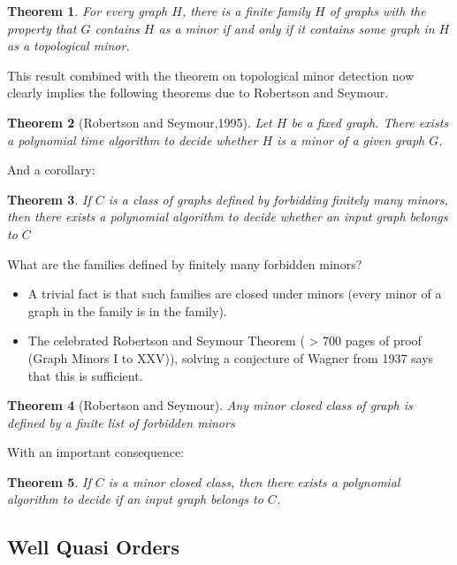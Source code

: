 \documentclass[12pt,a4paper]{article}
\newtheorem{theorem}{Theorem}
\begin{document}
\begin{theorem}
  For every graph $H$, there is a finite family $H$ of graphs with the property
  that $G$ contains $H$ as a minor if and only if it contains some graph in $H$
  as a topological minor.
\end{theorem}

This result combined with the theorem on topological minor detection now clearly
implies the following theorems due to Robertson and Seymour.

\begin{theorem}[Robertson and Seymour,1995]
  Let $H$ be a fixed graph. There exists a polynomial time algorithm to decide
  whether $H$ is a minor of a given graph $G$.
\end{theorem}

And a corollary:

\begin{theorem}
  If $C$ is a class of graphs defined by forbidding finitely many minors, then
  there exists a polynomial algorithm to decide whether an input graph belongs
  to $C$
\end{theorem}

What are the families defined by finitely many forbidden minors?
\begin{itemize}
\item A trivial fact is that such families are closed under minors (every minor
  of a graph in the family is in the family).
\item The celebrated Robertson and Seymour Theorem ( > 700 pages of proof (Graph
  Minors I to XXV)), solving a conjecture of Wagner from 1937 says that this is
  sufficient.
\end{itemize}

\begin{theorem}[Robertson and Seymour]
  Any minor closed class of graph is defined by a finite list of forbidden
  minors
\end{theorem}

With an important consequence:

\begin{theorem}
  If $C$ is a minor closed class, then there exists a polynomial algorithm to
  decide if an input graph belongs to $C$.
\end{theorem}

\subsection{Well Quasi Orders}
\end{document}

